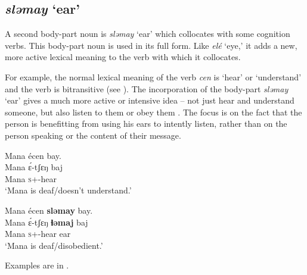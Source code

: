 \subsection{\textit{sləmay} ‘ear’}\label{sec:9.3.2}\label{sec:9.3.1.2}

A second body-part noun is \textit{sləmay} ‘ear’ which collocates with some cognition verbs.  This body-part noun is used in its full form. Like \textit{elé}  ‘eye,’ it adds a new, more active lexical meaning to the verb with which it collocates. 

For example, the normal lexical meaning of the verb \textit{cen } is ‘hear’ or ‘understand’  and the verb is bitransitive (see ). The incorporation of the body-part \textit{sləmay} ‘ear’ gives a much more active or intensive idea -- not just hear and understand someone, but also listen to them or obey them . The focus is on the fact that the person is benefitting from using his ears to intently listen, rather than on the person speaking or the content of their message. 

\ea \label{ex:9:55}
Mana  écen  bay.\\
\gll  Mana   \'{ɛ}-tʃɛŋ     baj\\
      Mana  \textsc{s}+{\IFV}-hear  {\NEG}\\
\glt  ‘Mana is deaf/doesn’t understand.’ 
\z

\ea \label{ex:9:56}
Mana  écen  \textbf{sləmay}  bay.\\
\gll  Mana  \'{ɛ}-tʃɛŋ     \textbf{ɬəmaj}   baj\\
      Mana  \textsc{s}+{\IFV}-hear  ear  {\NEG}\\
\glt  ‘Mana is deaf/disobedient.’
\z

Examples are in .

\begin{table}
\caption{Selected verbs of cognition with and without  incorporation of sləmay ‘ear’ \label{tab:77}}
\end{table}

